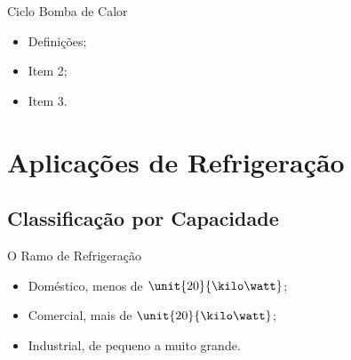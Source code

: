     \begin{frame}{Ciclo Bomba de Calor}\vspace*{-0em}
        \begin{itemize}
            \item<1-> Definições;
            \item<1-> Item 2;
            \item<1-> Item 3.
        \end{itemize}
    \end{frame}

\section{Aplicações de Refrigeração}

\subsection{Classificação por Capacidade}

    \begin{frame}{O Ramo de Refrigeração}\vspace*{-0em}
        \begin{itemize}
            \item<1-> Doméstico, \alert{menos de $\unit{20}{\kilo\watt}$};
            \item<2-> Comercial, \alert{mais de $\unit{20}{\kilo\watt}$};
            \item<3-> Industrial, \alert{de pequeno a muito grande}.
        \end{itemize}
    \end{frame}

